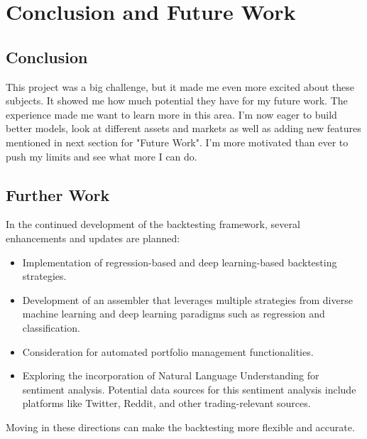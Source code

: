 \chapter{Conclusion and Future Work}

\section{Conclusion}
This project was a big challenge, but it made me even more excited about these subjects. It showed me how much potential they have for my future work.
The experience made me want to learn more in this area. I'm now eager to build better models, look at different assets and markets as well as adding new features mentioned in next section for "Future Work". I'm more motivated than ever to push my limits and see what more I can do.

\section{Further Work}
In the continued development of the backtesting framework, several enhancements and updates are planned:

\begin{itemize}
    \item Implementation of regression-based and deep learning-based backtesting strategies.
    \item Development of an assembler that leverages multiple strategies from diverse machine learning and deep learning paradigms such as regression and classification.
    \item Consideration for automated portfolio management functionalities.
    \item Exploring the incorporation of Natural Language Understanding for sentiment analysis. Potential data sources for this sentiment analysis include platforms like Twitter, Reddit, and other trading-relevant sources.
\end{itemize}

Moving in these directions can make the backtesting more flexible and accurate.
